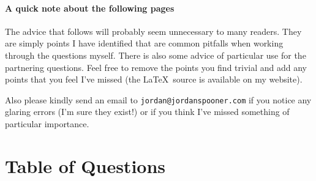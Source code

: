 \documentclass[9pt]{extarticle}
\begin{document}
	\paragraph{A quick note about the following pages} The advice that follows will probably seem unnecessary to many readers. They are simply points I have identified that are common pitfalls when working through the questions myself. There is also some advice of particular use for the partnering questions. Feel free to remove the points you find trivial and add any points that you feel I've missed (the \LaTeX\ source is available on my website).
	
	Also please kindly send an email to \texttt{jordan@jordanspooner.com} if you notice any glaring errors (I'm sure they exist!) or if you think I've missed something of particular importance.
	
	\section*{Table of Questions}
	
	\thispagestyle{empty}
	
\end{document}
